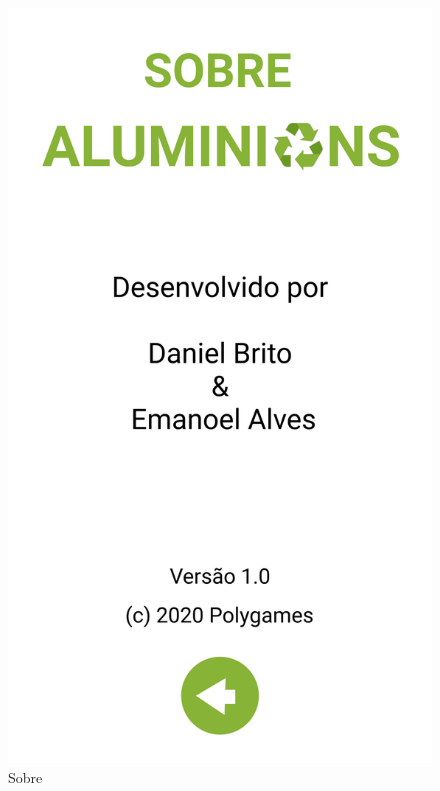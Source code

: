\documentclass[]{scrartcl}
\begin{document}
\begin{figure}[H]
	\begin{center}
		\includegraphics[scale=0.3]{figs/Game Design-18.png}
		\caption{Sobre}
	\end{center}
\end{figure}
\end{document}
